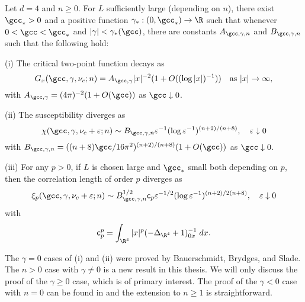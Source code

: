 \begin{theorem}
\label{thm:mr}
Let $d = 4$ and $n \ge 0$. For $L$ sufficiently large (depending on $n$),
there exist $\gcc_* > 0$
and a positive function $\gamma_* : (0, \gcc_*) \to \R$
such that whenever $0 < \gcc < \gcc_*$ and $|\gamma| < \gamma_*(\gcc)$,
there are constants $A_{\gcc,\gamma,n}$ and $B_{\gcc,\gamma,n}$ such that the following hold:

\smallskip\noindent
(i)
The critical two-point function decays as
\begin{equation}
G_x(\gcc,\gamma,\nu_c; n)
    =
A_{\gcc,\gamma} |x|^{-2} (1 + O((\log |x|)^{-1}))
    \quad
\text{as $|x|\to\infty$},
\end{equation}
with $A_{\gcc,\gamma} = (4 \pi)^{-2} (1 + O(\gcc))$ as $\gcc \downarrow 0$.

\smallskip\noindent
(ii)
The susceptibility diverges as
\begin{equation} \label{e:chieps-asympt}
\chi(\gcc, \gamma, \nu_c + \varepsilon; n)
	\sim
B_{\gcc,\gamma,n} \varepsilon^{-1} (\log \varepsilon^{-1})^{(n+2)/(n+8)},
	\quad
\varepsilon\downarrow 0
\end{equation}
with $B_{\gcc,\gamma,n} = ((n + 8) \gcc / 16\pi^2)^{(n+2)/(n+8)} (1 + O(\gcc))$
as $\gcc \downarrow 0$.

\smallskip\noindent
(iii)
For any $p >0$, if $L$ is chosen large and $\gcc_*$ small both depending on $p$,
then the correlation length of order $p$ diverges as
\begin{equation} \label{e:xieps-asympt}
\xi_p(\gcc, \gamma, \nu_c + \varepsilon; n)
	\sim
B_{\gcc,\gamma,n}^{1/2} {\sf c}_p \varepsilon^{-1/2} (\log \varepsilon^{-1})^{(n+2)/2(n+8)},
	\quad
\varepsilon\downarrow 0
\end{equation}
with
\begin{equation}
\label{e:cpdef}
{\sf c}_p^p
	=
\int_{\R^4} |x|^p (-\Delta_{\R^4} + 1)^{-1}_{0x} \; dx.
\end{equation}
\end{theorem}

The $\gamma = 0$ cases of (i) and (ii) were proved by Bauerschmidt, Brydges, and
Slade. The $n > 0$ case with $\gamma \ne 0$ is a new result in this thesis. We
will only discuss the proof of the $\gamma \ge 0$ case, which is of primary
interest. The proof of the $\gamma < 0$ case with $n = 0$ can be found in
\cite{BSW-saw-sa} and the extension to $n \ge 1$ is straightforward.